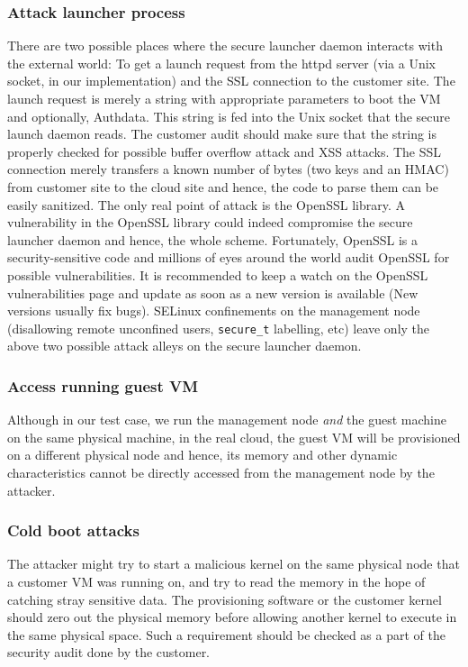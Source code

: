 \documentclass[10pt,twocolumn,pdftex]{article}
\begin{document}
\subsubsection{Attack launcher process}
There are two possible places where the secure launcher daemon interacts with the external world: To get a launch request from the httpd server (via a Unix socket, in our implementation) and the SSL connection to the customer site. The launch request is merely a string with appropriate parameters to boot the VM and optionally, Authdata. This string is fed into the Unix socket that the secure launch daemon reads. The customer audit should make sure that the string is properly checked for possible buffer overflow attack and XSS attacks. The SSL connection merely transfers a known number of bytes (two keys and an HMAC) from customer site to the cloud site and hence, the code to parse them can be easily sanitized. The only real point of attack is the OpenSSL library. A vulnerability in the OpenSSL library could indeed compromise the secure launcher daemon and hence, the whole scheme. Fortunately, OpenSSL is a security-sensitive code and millions of eyes around the world audit OpenSSL for possible vulnerabilities. It is recommended to keep a watch on the OpenSSL vulnerabilities page \cite{openssl-vulnerabilities} and update as soon as a new version is available (New versions usually fix bugs). 
SELinux confinements on the management node (disallowing remote unconfined users, {\tt secure\_t} labelling, etc) leave only the above two possible attack alleys on the secure launcher daemon.

\subsubsection{Access running guest VM}
Although in our test case, we run the management node \emph{and} the guest machine on the same physical machine, in the real cloud, the guest VM will be provisioned on a different physical node and hence, its memory and other dynamic characteristics cannot be directly accessed from the management node by the attacker.

\subsubsection{Cold boot attacks}
The attacker might try to start a malicious kernel on the same physical node that a customer VM was running on, and try to read the memory in the hope of catching stray sensitive data. The provisioning software or the customer kernel should zero out the physical memory before allowing another kernel to execute in the same physical space. Such a requirement should be checked as a part of the security audit done by the customer. 
\\
\end{document}
